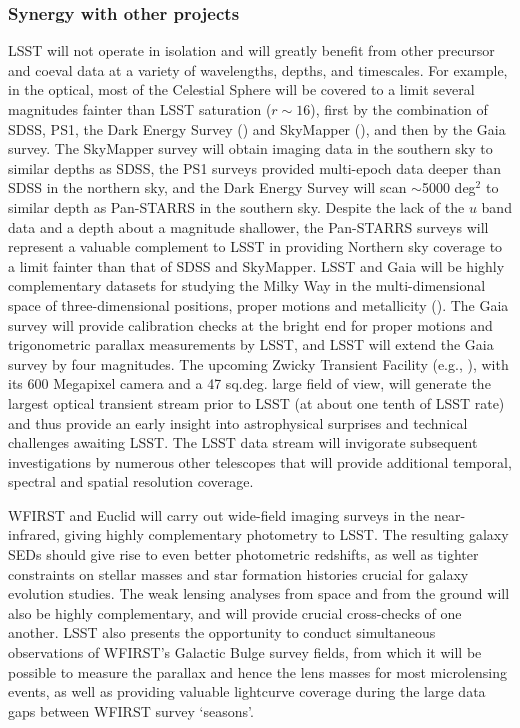 \subsubsection{  Synergy with other projects }

LSST will not operate in isolation and will greatly benefit from other precursor and coeval
data at a variety of wavelengths, depths, and timescales. For example,
in the optical, most of the Celestial
Sphere will be covered to a limit several magnitudes fainter than LSST saturation
($r\sim16$), first by the combination of SDSS, PS1, the Dark Energy Survey (\cite{Flaugher2006}) and SkyMapper (\cite{Keller2007}),
and then by the Gaia survey. The SkyMapper survey will obtain imaging data in the southern
sky to similar depths as SDSS, the PS1 surveys provided multi-epoch data deeper
than SDSS in the northern sky, and the Dark Energy Survey will scan
$\sim$5000 deg$^2$ to similar depth as Pan-STARRS in the southern sky. Despite the lack of
the $u$ band data and a depth about a magnitude shallower, the Pan-STARRS surveys
will represent a valuable complement to LSST in providing Northern sky coverage to a limit
fainter than that of SDSS and SkyMapper. LSST and Gaia will
be highly complementary datasets for studying the Milky Way in the multi-dimensional space of
three-dimensional positions, proper motions and metallicity (\cite{Ivezic2012}).
The Gaia survey will provide calibration checks at the bright end for proper
motions and trigonometric parallax measurements by LSST, and LSST will extend the
Gaia survey by four magnitudes. The upcoming Zwicky Transient Facility (e.g., \cite{Laher2017}),
with its 600 Megapixel camera and a 47 sq.deg. large field of view, will generate the largest
optical transient stream prior to LSST (at about one tenth of LSST rate) and thus provide
an early insight into astrophysical surprises and technical challenges awaiting LSST.
The LSST data stream will invigorate subsequent investigations by numerous other telescopes
that will provide additional temporal, spectral and spatial resolution coverage.

WFIRST and Euclid will carry out wide-field imaging surveys in the
near-infrared, giving highly complementary photometry to LSST.  The
resulting galaxy SEDs should give rise to even better photometric
redshifts, as well as tighter constraints on stellar masses and star
formation histories crucial for galaxy evolution studies.  The weak
lensing analyses from space and from the ground will also be highly
complementary, and will provide crucial cross-checks of one another.
LSST also presents the opportunity to conduct simultaneous observations
of WFIRST's Galactic Bulge survey fields, from which it will be possible to
measure the parallax and hence the lens masses for most microlensing
events, as well as providing valuable lightcurve coverage during the large
data gaps between WFIRST survey `seasons'.

